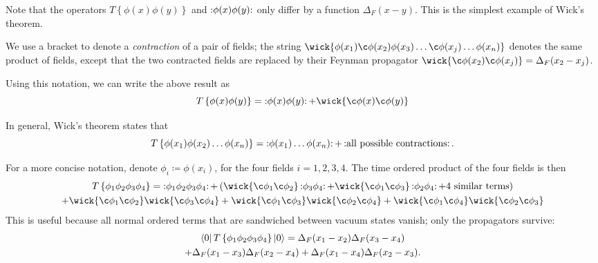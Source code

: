 Note that the operators $T \left\{ \phi(x) \phi(y) \right\}$ and $\mathop{:}\nolimits\!\phi(x) \phi(y) \!\mathop{:}\nolimits$ only differ by a function $\Delta_F(x - y)$.
This is the simplest example of Wick's theorem.
\begin{notation}
  We use a bracket to denote a \emph{contraction} of a pair of fields; the string $\wick{\phi(x_1) \c\phi(x_2) \phi(x_3)\dots \c\phi(x_j) \dots \phi(x_n)}$ denotes the same product of fields, except that the two contracted fields are replaced by their Feynman propagator $\wick{\c\phi(x_2) \c\phi(x_j)} = \Delta_F(x_2 - x_j)$.
\end{notation}
Using this notation, we can write the above result as
\begin{equation}
  T \left\{ \phi(x) \phi(y) \right\} = \normalorder{\phi(x) \phi(y) } + \wick{\c\phi(x) \c\phi(y)}
\end{equation}
\begin{theorem}
  In general, Wick's theorem states that
  \begin{equation}
    T \left\{ \phi(x_1) \phi(x_2) \dots \phi(x_n) \right\} = \mathop{:}\nolimits\!\phi(x_1) \dots \phi(x_n) \!\mathop{:}\nolimits + \mathop{:}\nolimits\!\text{all possible contractions} \!\mathop{:}\nolimits.
  \end{equation}
\end{theorem}
\begin{example}
  For a more concise notation, denote $\phi_i \coloneqq \phi(x_i)$, for the four fields $i = 1, 2, 3, 4$.
  The time ordered product of the four fields is then
  \begin{multline}
    T \left\{ \phi_1 \phi_2 \phi_3 \phi_4 \right\} 
    = \normalorder{\phi_1 \phi_2 \phi_3\phi_4 }
    + \left( \wick{\c\phi_1 \c\phi_2} \normalorder{\phi_3 \phi_4} + \wick{\c\phi_1 \c\phi_3} \normalorder{\phi_2 \phi_4}
    + \text{4 similar terms}\right)\\ 
    + \wick{\c\phi_1 \c\phi_2} \wick{\c\phi_3\c\phi_4}
    + \wick{\c\phi_1 \c\phi_3} \wick{\c\phi_2 \c\phi_4} + \wick{\c\phi_1\c\phi_4}\wick{\c\phi_2\c\phi_3}
  \end{multline}
  This is useful because all normal ordered terms that are sandwiched between vacuum states vanish; only the propagators survive:
  \begin{multline}
    \label{eq:four-field-tordered-product}
    \bra{0} T \left\{ \phi_1\phi_2\phi_3\phi_4 \right\} \ket{0} 
    = \Delta_F (x_1 - x_2) \Delta_F(x_3-x_4) \\ 
    + \Delta_F(x_1 - x_3) \Delta_F(x_2-x_4)
    + \Delta_F(x_1-x_4) \Delta_F(x_2 - x_3).
  \end{multline}
\end{example}
